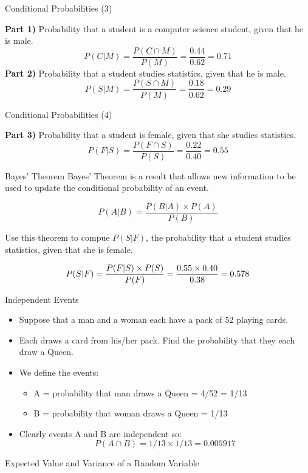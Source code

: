 {{{{{{{}
{
	{Conditional Probabilities (3)}
	
	\textbf{Part 1)} Probability that a student is a computer science student, given that he is male.
	\[ P(C|M) = \frac{P(C \cap M)}{P(M)}  = \frac{0.44}{0.62} = 0.71 \]
	\textbf{Part 2)} Probability that a student studies statistics, given that he is male.
	\[ P(S|M) = \frac{P(S \cap M)}{P(M)}  = \frac{0.18}{0.62} = 0.29 \]
	
}

{
	{Conditional Probabilities (4)}
	
	\textbf{Part 3)} Probability that a student is female, given that she studies statistics.
	\[ P(F|S) = \frac{P(F \cap S)}{P(S)}  = \frac{0.22}{0.40} = 0.55 \]
	
	
	
	
}
{
	{Bayes' Theorem}
	Bayes' Theorem is a result that allows new information to be used to update the conditional probability of an event.
	\bigskip
	
	\[ P(A|B) = \frac{P(B|A)\times P(A)}{P(B)} \]
	
	Use this theorem to compue $P(S|F)$, the probability that a student studies statistics, given that she is female.
	
	\[ P(S|F) = \frac{P(F|S)\times P(S)}{P(F)} = {0.55 \times 0.40 \over 0.38} = 0.578\]
}

{
	{Independent Events}
	\begin{itemize}
		\item Suppose that a man and a woman each have a pack of 52 playing cards.
		\item Each draws a card from his/her pack. Find the probability that they each draw a Queen.
		\item We define the events:
		\begin{itemize} \normalsize \item A = probability that man draws a Queen = 4/52  = 1/13
			\item B = probability that woman draws a Queen = 1/13
		\end{itemize} \item Clearly events A and B are independent so:
		\[ P(A \cap B) = 1/13 \times 1/13 = 0.005917 \]
	\end{itemize}
	
}
{
	{Expected Value and Variance of a Random Variable}
	
}}}}}}}
